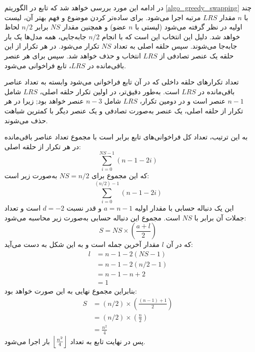 در ادامه این مورد بررسی خواهد شد که تابع
در الگوریتم
\ref{algo_greedy_swapping}
چند مرتبه اجرا می‌شود. 
برای ساده‌تر کردن موضوع و فهم بهتر آن، لیست ‎\(LRS\) با \( n \) مقدار اولیه در نظر گرفته می‌شود (لیستی با \( n \) عضو) و همچنین مقدار \( NS \) برابر \( n/2 \) لحاظ خواهد شد. دلیل این انتخاب این است که با انجام \( n/2 \) جابه‌جایی، همه مدل‌ها یک بار جابه‌جا می‌شوند.
سپس حلقه اصلی به تعداد \( NS \) تکرار می‌شود. در هر تکرار از این حلقه یک عنصر تصادفی از \( LRS \) انتخاب و حذف خواهد شد. سپس برای هر عنصر باقی‌مانده در \( LRS \)، تابع
فراخوانی می‌شود.

تعداد تکرارهای حلقه داخلی که در آن تابع
فراخوانی می‌شود وابسته به تعداد عناصر باقی‌مانده در \( LRS \) است. به‌طور دقیق‌تر، در اولین تکرار حلقه اصلی، \( LRS \) شامل \(n-1\) عنصر است و در دومین تکرار، \( LRS \) شامل \(n-3\) عنصر خواهد بود; زیرا در هر تکرار از حلقه اصلی، یک عنصر به‌صورت تصادفی و یک عنصر دیگر با کمترین شباهت حذف می‌شوند.

به این ترتیب، تعداد کل فراخوانی‌های تابع
برابر است با مجموع تعداد عناصر باقی‌مانده در هر تکرار از حلقه اصلی:
\begin{equation}
	\sum_{i=0}^{NS-1} (n-1-2i)
\end{equation}
که این مجموع برای \( NS=n/2 \) به‌صورت زیر است:
\begin{equation}
	\sum_{i=0}^{(n/2)-1} (n-1-2i)
\end{equation}
این یک دنباله حسابی با مقدار اولیه \(a=n-1\) و قدر نسبت
 \(d=-2\) 
است و تعداد جملات آن برابر با \( NS \) است.
مجموع این دنباله حسابی به‌صورت زیر محاسبه می‌شود:
\begin{equation}
	S = NS \times \left( \frac{a+l}{2} \right)
\end{equation}
که در آن \( l \) مقدار آخرین جمله است و به این شکل به دست می‌آید:
\begin{equation}
	\begin{align*} 
		l &= n-1-2(NS-1) \\
		  &= n-1-2(n/2-1) \\
		  &= n-1-n+2 \\
		  &= 1
	\end{align*}
\end{equation}
بنابراین مجموع نهایی به این صورت خواهد بود:
\begin{equation}
	\begin{align*} 
		S &= (n/2) \times \left( \frac{(n-1)+1}{2} \right) \\
		&= (n/2) \times \left( \frac{n}{2} \right) \\
		&= \frac{n^2}{4}
	\end{align*}
\end{equation}
پس در نهایت تابع
به تعداد
\(
\left \lfloor \frac{n^2}{4} \right \rfloor
 \) 
بار اجرا می‌شود.



